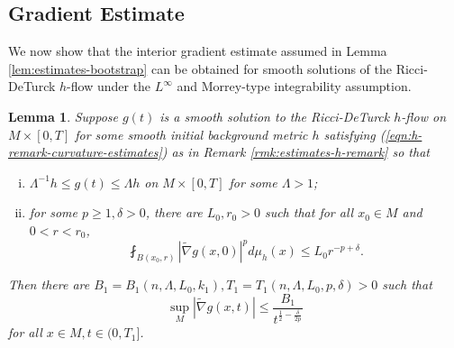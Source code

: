 \documentclass[12pt]{amsart}
\theoremstyle{plain}
\theoremstyle{plain}
\newtheorem{lemma}[subsection]{Lemma}
\theoremstyle{definition}
\theoremstyle{remark}
\numberwithin{equation}{subsection}
\newcommand{\hdel}{\tilde{\nabla}}
\begin{document}
\subsection{Gradient Estimate}

We now show that the interior gradient estimate assumed in Lemma \ref{lem:estimates-bootstrap} can be obtained for smooth solutions of the Ricci-DeTurck $h$-flow under the $L^\infty$ and Morrey-type integrability assumption.

\begin{lemma}\label{lem:gradient-estimate}
    Suppose $g(t)$ is a smooth solution to the Ricci-DeTurck $h$-flow on $M \times [0,T]$ for some smooth initial background metric $h$ satisfying (\ref{eqn:h-remark-curvature-estimates}) as in Remark \ref{rmk:estimates-h-remark} so that
    \begin{enumerate}[(i)]
        \item $\Lambda^{-1}h \leq g(t) \leq \Lambda h$ on $M\times[0,T]$ for some $\Lambda > 1$;
        \item for some $p \geq 1, \delta > 0$, there are $L_0, r_0 > 0$ such that for all $x_0 \in M$ and $0 < r < r_0$,
        \begin{equation*}
            \fint_{B(x_0,r)} |\hdel g(x,0)|^p d\mu_h(x) \leq L_0r^{-p+\delta}.
        \end{equation*}
    \end{enumerate}
    Then there are $B_1 = B_1(n,\Lambda,L_0,k_1), T_1 = T_1(n,\Lambda,L_0,p,\delta) > 0$ such that
    \begin{equation}\label{eqn:interior-gradient-estimate}
        \sup\limits_M|\hdel g(x,t)| \leq \frac{B_1}{t^{\frac{1}{2}-\frac{\delta}{2p}}}
    \end{equation}
    for all $x \in M, t \in (0, T_1]$.
\end{lemma}
\end{document}
